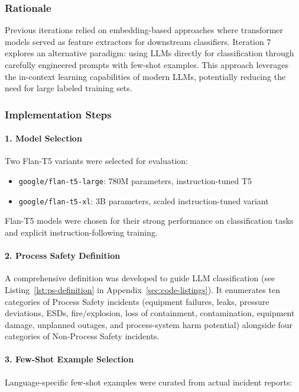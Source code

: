 \documentclass[11pt, titlepage, bibliography=totoc]{scrreprt}
\begin{document}
\subsubsection{Rationale}
Previous iterations relied on embedding-based approaches where transformer models served as feature extractors for downstream classifiers. Iteration 7 explores an alternative paradigm: using LLMs directly for classification through carefully engineered prompts with few-shot examples. This approach leverages the in-context learning capabilities of modern LLMs, potentially reducing the need for large labeled training sets.

\subsubsection{Implementation Steps}

\paragraph{1. Model Selection}
Two Flan-T5 variants were selected for evaluation:

\begin{itemize}
    \item \texttt{google/flan-t5-large}: 780M parameters, instruction-tuned T5
    \item \texttt{google/flan-t5-xl}: 3B parameters, scaled instruction-tuned variant
\end{itemize}

Flan-T5 models were chosen for their strong performance on classification tasks and explicit instruction-following training.

\paragraph{2. Process Safety Definition}
A comprehensive definition was developed to guide LLM classification (see Listing~\ref{lst:ps-definition} in Appendix~\ref{sec:code-listings}). It enumerates ten categories of Process Safety incidents (equipment failures, leaks, pressure deviations, ESDs, fire/explosion, loss of containment, contamination, equipment damage, unplanned outages, and process-system harm potential) alongside four categories of Non-Process Safety incidents.

\paragraph{3. Few-Shot Example Selection}
Language-specific few-shot examples were curated from actual incident reports:
\end{document}
